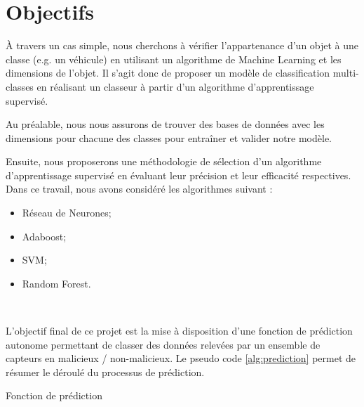 \documentclass[a4paper]{report}
\begin{document}
\section{Objectifs}

À travers un cas simple, nous cherchons à vérifier l'appartenance d'un objet à une classe (e.g. un véhicule) en utilisant un algorithme de Machine Learning et les dimensions de l'objet. Il s'agit donc de proposer un modèle de classification multi-classes en réalisant un classeur à partir d'un algorithme d'apprentissage supervisé.

Au préalable, nous nous assurons de trouver des bases de données avec les dimensions pour chacune des classes pour entraîner et valider notre modèle. 

Ensuite, nous proposerons une méthodologie de sélection d'un algorithme d'apprentissage supervisé en évaluant leur précision et leur efficacité respectives. Dans ce travail, nous avons considéré les algorithmes suivant : 

\begin{itemize}
\label{classifiers}
\item Réseau de Neurones;
\item Adaboost;
\item SVM;
\item Random Forest.
\end{itemize}

~\par

\noindent L'objectif final de ce projet est la mise à disposition d'une fonction de prédiction autonome permettant de classer des données relevées par un ensemble de capteurs en malicieux / non-malicieux. Le pseudo code \ref{alg:prediction} permet de résumer le déroulé du processus de prédiction.

\begin{algorithm}[h]
\SetAlgoLined

\medbreak


\medbreak


\medbreak

\caption{Fonction de prédiction\label{alg:prediction}}
\end{algorithm}
\end{document}
